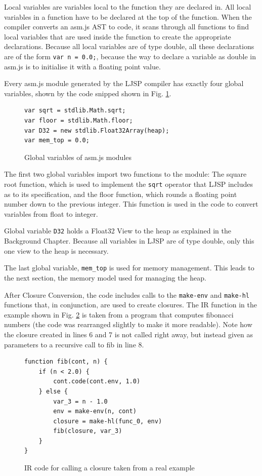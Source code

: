 \documentclass[11pt]{report}
\begin{document}
Local variables are variables local to the function they are declared in. All local variables in a function have to be declared at the top of the function. When the compiler converts an asm.js AST to code, it scans through all functions to find local variables that are used inside the function to create the appropriate declarations. Because all local variables are of type double, all these declarations are of the form \texttt{var n = 0.0;}, because the way to declare a variable as double in asm.js is to initialise it with a floating point value.

Every asm.js module generated by the LJSP compiler has exactly four global variables, shown by the code snipped shown in Fig. \ref{iasmjsmm1}. 
\begin{figure}[ht]
\begin{lstlisting}
var sqrt = stdlib.Math.sqrt;
var floor = stdlib.Math.floor;
var D32 = new stdlib.Float32Array(heap);
var mem_top = 0.0;
\end{lstlisting}
\caption{Global variables of asm.js modules}
\label{iasmjsmm1}
\end{figure}

The first two global variables import two functions to the module: The square root function, which is used to implement the \texttt{sqrt} operator that LJSP includes as to its specification, and the floor function, which rounds a floating point number down to the previous integer. This function is used in the code to convert variables from float to integer.

Global variable \texttt{D32} holds a Float32 View to the heap as explained in the Background Chapter. Because all variables in LJSP are of type double, only this one view to the heap is necessary.

The last global variable, \texttt{mem_top} is used for memory management. This leads to the next section, the memory model used for managing the heap.

After Closure Conversion, the code includes calls to the \texttt{make-env} and \texttt{make-hl} functions that, in conjunction, are used to create closures.  The IR function in the example shown in Fig. \ref{iasmjsmm2} is taken from a program that computes fibonacci numbers (the code was rearranged slightly to make it more readable). Note how the closure created in lines 6 and 7 is not called right away, but instead given as parameters to a recursive call to fib in line 8.

\begin{figure}[ht]
\begin{lstlisting}
function fib(cont, n) {
    if (n < 2.0) {
        cont.code(cont.env, 1.0)
    } else {
        var_3 = n - 1.0
        env = make-env(n, cont)
        closure = make-hl(func_0, env)
        fib(closure, var_3)
    }
}
\end{lstlisting}
\caption{IR code for calling a closure taken from a real example}
\label{iasmjsmm2}
\end{figure}
\end{document}
